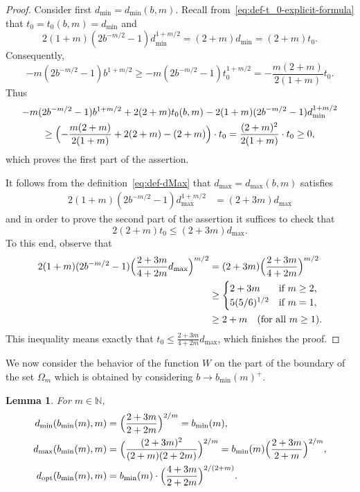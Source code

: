 \documentclass[a4paper]{amsart} %
\newtheorem{lemma}[theorem]{Lemma}
\theoremstyle{definition}
\theoremstyle{remark}
\numberwithin{equation}{section}
\newcommand*{\NNone}{\mathbb{N}}
\newcommand*{\specialbd}[1]{\Omega_{#1}}
\newcommand*{\XXXspecialbd}{W}
\newcommand*{\bMin}{b_{\min}}
\newcommand*{\dMin}{d_{\min}}
\newcommand*{\dMax}{d_{\max}}
\newcommand*{\dOpt}{d_{\mathrm{opt}}}
\begin{document}
\begin{proof}
	Consider first $\dMin=\dMin(b,m)$.
	Recall from~\eqref{eq:def-t_0-explicit-formula} that $t_0 = t_0(b,m) = \dMin$ 
	and
	\begin{equation*}
	2(1+m)(2 b^{-m/2} -1)\dMin^{1+m/2} 
	=  (2+m) \dMin =  (2+m) t_0.
	\end{equation*} 
	Consequently,
	\begin{equation*}
	-m(2 b^{-m/2} -1)b^{1+m/2} \geq -m(2 b^{-m/2} -1) t_0^{1+m/2} = -\frac{m(2+m)}{2(1+m)} t_0.
	\end{equation*} 
	Thus
	\begin{multline*}
	-m(2 b^{-m/2} -1)b^{1+m/2} 
	+2(2+m) t_0(b,m) - 2(1+m)(2 b^{-m/2} -1)\dMin^{1+m/2}\\
	\geq \Bigl(-\frac{m(2+m)}{2(1+m)} + 2(2+m) - (2+m)\Bigr)\cdot t_0 = \frac{(2+m)^2}{2(1+m)} \cdot t_0 \geq 0,
	\end{multline*}
	which proves the first part of the assertion.
	
	It follows from the definition~\eqref{eq:def-dMax} that $\dMax = \dMax(b,m)$ satisfies
	\begin{align*}
	2(1+m)(2 b^{-m/2} -1)\dMax^{1+m/2}
	&= (2+3m) \dMax
	\end{align*} 
	and in order to prove the second part of the assertion  
	it suffices to check that
	\[
	2(2+m) t_0 \leq (2+3m) \dMax.
	\]
	To this end, observe that
	\begin{align*}
	2(1+m)(2 b^{-m/2} -1)\Bigl( \frac{2+3m}{4+2m} \dMax\Bigr)^{m/2}  
	&= (2+3m)\Bigl( \frac{2+3m}{4+2m} \Bigr)^{m/2}\\
	&\geq
	\begin{cases}
	2+3m & \text{if } m\geq 2,\\
	5 (5/6)^{1/2} & \text{if } m=1,
	\end{cases}
	\\
	&\geq 
	2+m \quad \text{(for all $m\geq 1$)}.
	\end{align*}
	This inequality means exactly that $t_0 \leq \frac{2+3m}{4+2m} \dMax$,
	which finishes the proof.
\end{proof}






We now consider the behavior of the function $\XXXspecialbd$
on the part of the boundary of the  set $\specialbd{m}$ 
which is obtained by considering $b \to \bMin(m) ^+$.

\begin{lemma}
	\label{lem:lower-bound-fixed-m-special-b-c-d-boundary-bMin}
	For $m\in\NNone$,
	\begin{align}
	\nonumber
	\dMin(\bMin(m), m) &= \Bigl( \frac{2+3m}{2+2m}\Bigr)^{2/m} = \bMin(m),\\	
	\nonumber
	\dMax(\bMin(m),m) &= \Bigl(\frac{(2+3m)^2}{(2+m)(2+2m)}\Bigr)^{2/m}
	= \bMin(m) \Bigl(\frac{2+3m}{2+m}\Bigr)^{2/m},\\
	\label{eq:dOpt-for-bMin}
	\dOpt(\bMin(m),m) &= \bMin(m) \cdot \Bigl( \frac{4+3m}{2+2m}\Bigr)^{2/(2+m)}.
	\end{align}
\end{lemma}
\end{document}
